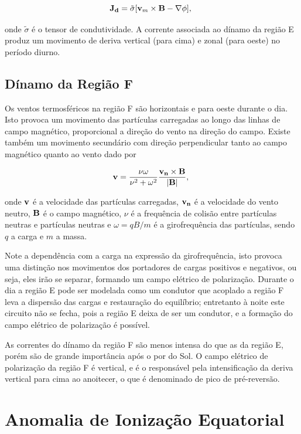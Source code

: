 \begin{equation}
{\bf J_d}=\tilde{\sigma}[{\bf v}_m\times{\bf B}-{\bf \nabla}\phi]\mbox{,}~
\end{equation}

onde $\tilde{\sigma}$ é o tensor de condutividade. A corrente associada ao dínamo da região E produz um movimento de deriva vertical (para cima) e zonal (para oeste) no período diurno.

\subsection{Dínamo da Região F}

Os ventos termosféricos na região F são horizontais e para oeste durante o dia. Isto provoca um movimento das partículas carregadas ao longo das linhas de campo magnético, proporcional a direção do vento na direção do campo. Existe também um movimento secundário com direção perpendicular tanto ao campo magnético quanto ao vento \cite{BATISTA:1986} dado por

\begin{equation}
{\bf v}=\frac{\nu\omega}{\nu^2+\omega^2}\frac{{\bf v_n}\times{\bf B}}{|{\bf B}|}\mbox{,}~
\end{equation}

onde ${\bf v}$ é a velocidade das partículas carregadas, ${\bf v_n}$ é a velocidade do vento neutro, ${\bf B}$ é o campo magnético, $\nu$ é a frequência de colisão entre partículas neutras e partículas neutras e $\omega={qB/m}$ é a girofrequência das partículas, sendo $q$ a carga e $m$ a massa.

Note a dependência com a carga na expressão da girofrequência, isto provoca uma distinção nos movimentos dos portadores de cargas positivos e negativos, ou seja, eles irão se separar, formando um campo elétrico de polarização. Durante o dia a região E pode ser modelada como um condutor que acoplado a região F leva a dispersão das cargas e restauração do equilíbrio; entretanto à noite este circuito não se fecha, pois a região E deixa de ser um condutor, e a formação do campo elétrico de polarização é possível.

As correntes do dínamo da região F são menos intensa do que as da região E, porém são de grande importância após o por do Sol. O campo elétrico de polarização da região F é vertical, e é o responsável pela intensificação da deriva vertical para cima ao anoitecer, o que é denominado de pico de pré-reversão.

\section{Anomalia de Ionização Equatorial}

